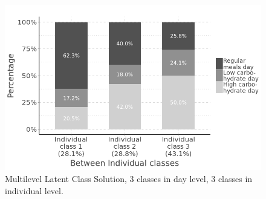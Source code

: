 \begin{figure}[H]
	\centering
	\includegraphics[width=13cm]{Figures/level2.png}
	\decoRule
	\caption[Multilevel Latent Class Solution ($3\times3$).]{Multilevel Latent Class Solution, 3 classes in day level, 3 classes in individual level.}
	\label{fig:level2}
\end{figure}
\vspace{-0.6cm}



